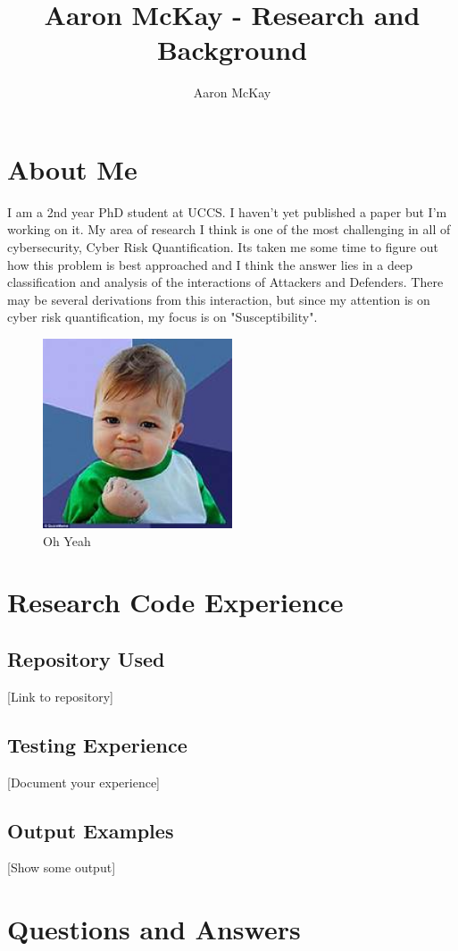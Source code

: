 \documentclass{article}
\begin{document}
\title{Aaron McKay - Research and Background}
\author{Aaron McKay}
\maketitle

\section{About Me}
I am a 2nd year PhD student at UCCS.  I haven't yet published a paper but I'm working on it.  My area of research I think is one of the most challenging in all of cybersecurity, Cyber Risk Quantification.  Its taken me some time to figure out how this problem is best approached and I think the answer lies in a deep classification and analysis of the interactions of Attackers and Defenders. There may be several derivations from this interaction, but since my attention is on cyber risk quantification, my focus is on "Susceptibility". 

\begin{figure}[h]
    \centering
    \includegraphics[width=0.5\textwidth]{images/Oh_Yeah.jpg}
    \caption{Oh Yeah}
    \label{fig:oh-yeah}
\end{figure}

\section{Research Code Experience}
\subsection{Repository Used}
[Link to repository]

\subsection{Testing Experience}
[Document your experience]

\subsection{Output Examples}
[Show some output]

\section{Questions and Answers}
\end{document}

